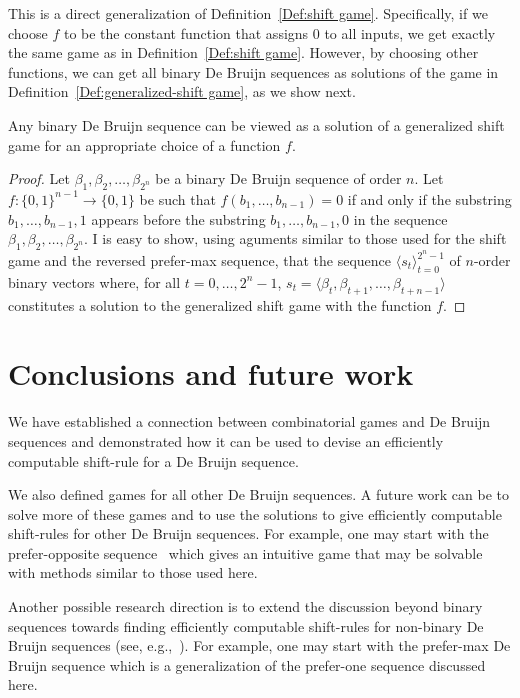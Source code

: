 \documentclass[final,12pt]{elsarticle}
\theoremstyle{definition} \newtheorem{definition}[theorem]{Definition} \newtheorem{observation}[theorem]{Observation} \newtheorem{example}[theorem]{Example} \newtheorem{remark}[theorem]{Remark} \newtheorem{corrolary}[theorem]{Corrolary}
\newcommand{\REF}[2]{#1~\ref{#2}}
\newcommand{\T}[1]{\langle{#1}\rangle} \DeclareMathOperator{\drop}{drop} \DeclareMathOperator{\dropbits}{drop\_bits} \DeclareMathOperator{\dropstates}{drop\_states} \DeclareMathOperator{\leadingForm}{LeadingForm} \DeclareMathOperator{\dv}{div} %
\begin{document}
This is a direct generalization of \REF{Definition}{Def:shift game}. Specifically, if we choose $f$ to be the constant function that assigns 0 to all inputs, we get exactly the same game as in \REF{Definition}{Def:shift game}. However, by choosing other functions, we can get all binary De Bruijn sequences as solutions of the game in \REF{Definition}{Def:generalized-shift game}, as we show next.

\begin{proposition}
	Any binary De Bruijn sequence can be viewed as a solution of a generalized shift game for an appropriate choice of a function $f$.
\end{proposition}
\begin{proof}
	Let $\beta_1, \beta_2, \dots, \beta_{2^n}$ be a binary De Bruijn sequence of order $n$. Let $f\colon \{0,1\}^{n-1} \to \{0,1\}$ be such that $f(b_1,\dots,b_{n-1})=0$ if and only if the substring $b_1,\dots,b_{n-1},1$ appears before the substring $b_1,\dots,b_{n-1},0$ in the sequence $\beta_1, \beta_2, \dots, \beta_{2^n}$. I is easy to show, using aguments similar to those used for the shift game and the reversed prefer-max sequence, that the sequence $ \T{s_t}_{t=0}^{2^n-1}$ of $n$-order binary vectors where, for all $t=0,\dots,2^n-1$, $s_t=\T{\beta_t, \beta_{t+1}, \dots,\beta_{t+n-1}}$ constitutes a solution to the generalized shift game with the function $f$.
\end{proof}

\section{Conclusions and future work}
We have established a connection between combinatorial games and De Bruijn sequences and demonstrated how it can be used to devise an efficiently computable shift-rule for a De Bruijn sequence.

We also defined games for all other De Bruijn sequences. A future work can be to solve more of these games and to use the solutions to give efficiently computable shift-rules for other De Bruijn sequences. For example, one may start with the prefer-opposite sequence~\cite{alhakim2010simple} which gives an intuitive game that may be solvable with methods similar to those used here.

Another possible research direction is to extend the discussion beyond binary sequences towards finding efficiently computable shift-rules for non-binary De Bruijn sequences (see, e.g.,~\cite{SAWADA2017524}). For example, one may start with the prefer-max De Bruijn sequence which is a generalization of the prefer-one sequence discussed here.  
	
	


\end{document}
